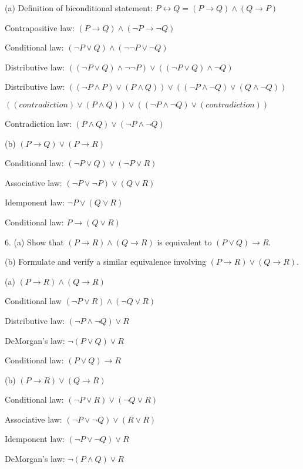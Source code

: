 \documentclass{article}
\begin{document}
(a) Definition of biconditional statement: $P \leftrightarrow Q = (P \to Q) \land (Q \to P)$

Contrapositive law: $(P \to Q) \land (\neg P \to \neg Q)$

Conditional law: $(\neg P \lor Q) \land (\neg \neg P \lor \neg Q)$

Distributive law: $((\neg P \lor Q ) \land \neg \neg P) \lor ((\neg P \lor Q) \land \neg Q)$

Distributive law: $((\neg P \land P) \lor (P \land Q)) \lor ((\neg P \land \neg Q) \lor (Q \land \neg Q))$

$((contradiction) \lor (P \land Q)) \lor ((\neg P \land \neg Q) \lor (contradiction))$

Contradiction law: $(P \land Q) \lor (\neg P \land \neg Q)$
\vspace{30pt}

(b) $(P \to Q) \lor (P \to R)$

Conditional law: $(\neg P \lor Q) \lor (\neg P \lor R)$

Associative law: $(\neg P \lor \neg P) \lor (Q \lor R)$

Idemponent law: $\neg P \lor (Q \lor R)$

Conditional law: $P \to (Q \lor R)$
\vspace{30pt}

6. (a) Show that $(P \to R) \land (Q \to R)$ is equivalent to $(P \lor Q) \to R$.

\hspace{12pt}(b) Formulate and verify a similar equivalence involving $(P \to R) \lor (Q \to R)$.
\vspace{20pt}

(a) $(P \to R) \land (Q \to R)$

Conditional law $(\neg P \lor R) \land (\neg Q \lor R)$

Distributive law: $(\neg P \land \neg Q) \lor R$

DeMorgan's law: $\neg (P \lor Q) \lor R$

Conditional law: $(P \lor Q) \to R$
\vspace{10pt}

(b) $(P \to R) \lor (Q \to R)$

Conditional law: $(\neg P \lor R) \lor (\neg Q \lor R)$

Associative law: $(\neg P \lor \neg Q) \lor (R \lor R)$

Idemponent law: $(\neg P \lor \neg Q) \lor R$

DeMorgan's law: $\neg (P \land Q) \lor R$
\end{document}
